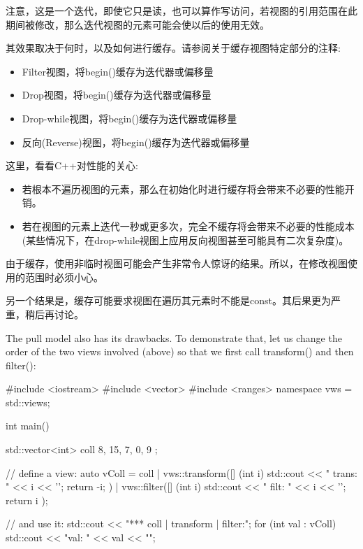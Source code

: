 注意，这是一个迭代，即使它只是读，也可以算作写访问，若视图的引用范围在此期间被修改，那么迭代视图的元素可能会使以后的使用无效。

其效果取决于何时，以及如何进行缓存。请参阅关于缓存视图特定部分的注释:

\begin{itemize}
\item
Filter视图，将begin()缓存为迭代器或偏移量

\item
Drop视图，将begin()缓存为迭代器或偏移量

\item
Drop-while视图，将begin()缓存为迭代器或偏移量

\item
反向(Reverse)视图，将begin()缓存为迭代器或偏移量
\end{itemize}

这里，看看C++对性能的关心:

\begin{itemize}
\item
若根本不遍历视图的元素，那么在初始化时进行缓存将会带来不必要的性能开销。

\item
若在视图的元素上迭代一秒或更多次，完全不缓存将会带来不必要的性能成本(某些情况下，在drop-while视图上应用反向视图甚至可能具有二次复杂度)。
\end{itemize}

由于缓存，使用非临时视图可能会产生非常令人惊讶的结果。所以，在修改视图使用的范围时必须小心。

另一个结果是，缓存可能要求视图在遍历其元素时不能是const。其后果更为严重，稍后再讨论。


The pull model also has its drawbacks. To demonstrate that, let us change the order of the two views involved (above) so that we first call transform() and then filter():


\begin{cpp}
#include <iostream>
#include <vector>
#include <ranges>
namespace vws = std::views;

int main()
{
	std::vector<int> coll{ 8, 15, 7, 0, 9 };
	
	// define a view:
	auto vColl = coll
	| vws::transform([] (int i) {
		std::cout << " trans: " << i << '\n';
		return -i;
	})
	| vws::filter([] (int i) {
		std::cout << " filt: " << i << '\n';
		return i %
	});
	
	// and use it:
	std::cout << "*** coll | transform | filter:\n";
	for (int val : vColl) {
	std::cout << "val: " << val << "\n\n";
	}
}
\end{cpp}

